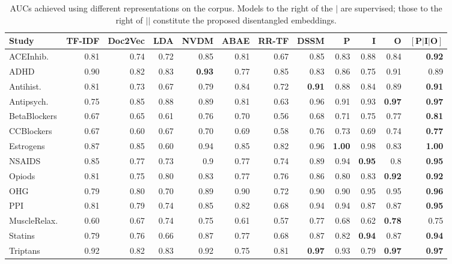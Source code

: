 \documentclass[11pt,a4paper]{article}
\begin{document}
\begin{table}%
\small
\setlength{\tabcolsep}{3pt}
\centering
\begin{tabular}{l r r r r r|r r || r r r r}
Study &  TF-IDF &  Doc2Vec&  LDA &  NVDM &  ABAE&  RR-TF &  DSSM & $\mathbf{P}$ & $\mathbf{I}$ & $\mathbf{O}$ & $\mathbf{[P|I|O]}$ \\ 
\hline
ACEInhib.  & 0.81 & 0.74 & 0.72 & 0.85 & 0.81 & 0.67 & 0.85 & 0.83 & 0.88 & 0.84 &  \textbf{0.92} \\
ADHD  & 0.90 & 0.82 & 0.83 &  \textbf{0.93}  & 0.77 & 0.85 & 0.83 & 0.86 & 0.75 & 0.91 &  0.89 \\ 
Antihist. & 0.81 & 0.73 & 0.67 & 0.79 & 0.84 & 0.72 & \textbf{0.91} & 0.88 & 0.84 & 0.89 &  \textbf{0.91} \\  
Antipsych.  & 0.75 & 0.85 & 0.88 & 0.89 & 0.81 & 0.63 & 0.96 & 0.91 & 0.93 &  \textbf{0.97} &  \textbf{0.97} \\ 
BetaBlockers  & 0.67 & 0.65 & 0.61 & 0.76 & 0.70 & 0.56 & 0.68 & 0.71 & 0.75 & 0.77 &  \textbf{0.81} \\ 
CCBlockers  & 0.67 & 0.60 & 0.67 & 0.70 & 0.69 & 0.58 & 0.76 & 0.73 & 0.69 & 0.74 &  \textbf{0.77} \\ 
Estrogens  & 0.87 & 0.85 & 0.60 & 0.94 & 0.85 & 0.82 & 0.96 &  \textbf{1.00} & 0.98 & 0.83 &  \textbf{1.00} \\ 
NSAIDS  & 0.85 & 0.77 & 0.73 & 0.9 & 0.77 & 0.74 & 0.89 & 0.94 &  \textbf{0.95} & 0.8 &  \textbf{0.95} \\ 
Opiods  & 0.81 & 0.75 & 0.80 & 0.83 & 0.77 & 0.76 & 0.86 & 0.80 & 0.83 &  \textbf{0.92} &  \textbf{0.92} \\ 
OHG  & 0.79 & 0.80 & 0.70 & 0.89 & 0.90 & 0.72 & 0.90 & 0.90 & 0.95 & 0.95 &  \textbf{0.96} \\
PPI  & 0.81 & 0.79 & 0.74 & 0.85 & 0.82 & 0.68 & 0.94 & 0.94 & 0.87 & 0.87 &  \textbf{0.95} \\  
MuscleRelax.  & 0.60 & 0.67 & 0.74 & 0.75 & 0.61 & 0.57 & 0.77 & 0.68 & 0.62 &  \textbf{0.78}&  0.75 \\ 
Statins  & 0.79 & 0.76 & 0.66 & 0.87 & 0.77 & 0.68 & 0.87 & 0.82 &  \textbf{0.94} & 0.87 &  \textbf{0.94} \\  
Triptans  & 0.92 & 0.82 & 0.83 & 0.92 & 0.75 & 0.81 & \textbf{0.97}& 0.93 & 0.79 &  \textbf{0.97}  &  \textbf{0.97} \\  
\end{tabular}
\vspace{-.65em}
\caption{AUCs achieved using different representations on the  corpus. Models to the right of the $\vert$ are supervised; those to the right of $\vert \vert$ constitute the proposed disentangled embeddings. } 
\label{table:cohenauc}
\end{table}
\end{document}
